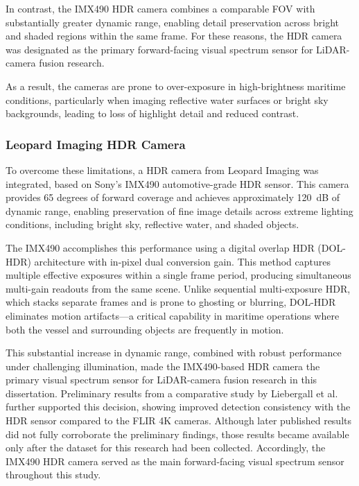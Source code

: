 \documentclass{erauthesis}
\begin{document}
In contrast, the IMX490 \ac{HDR} camera combines a comparable \ac{FOV} with substantially greater dynamic range, enabling detail preservation across bright and shaded regions within the same frame.  
For these reasons, the \ac{HDR} camera was designated as the primary forward-facing visual spectrum sensor for \ac{LiDAR}-camera fusion research.  
 
As a result, the cameras are prone to over-exposure in high-brightness maritime conditions, particularly when imaging reflective water surfaces or bright sky backgrounds, leading to loss of highlight detail and reduced contrast.  

\subsubsection{Leopard Imaging HDR Camera}

To overcome these limitations, a \ac{HDR} camera from Leopard Imaging was integrated, based on Sony’s IMX490 automotive-grade \ac{HDR} sensor.  
This camera provides 65 degrees of forward coverage and achieves approximately 120~dB of dynamic range, enabling preservation of fine image details across extreme lighting conditions, including bright sky, reflective water, and shaded objects.  

The IMX490 accomplishes this performance using a digital overlap \ac{HDR} (DOL-HDR) architecture with in-pixel dual conversion gain.  
This method captures multiple effective exposures within a single frame period, producing simultaneous multi-gain readouts from the same scene.  
Unlike sequential multi-exposure \ac{HDR}, which stacks separate frames and is prone to ghosting or blurring, DOL-\ac{HDR} eliminates motion artifacts—a critical capability in maritime operations where both the vessel and surrounding objects are frequently in motion.  

This substantial increase in dynamic range, combined with robust performance under challenging illumination, made the IMX490-based \ac{HDR} camera the primary visual spectrum sensor for \ac{LiDAR}-camera fusion research in this dissertation.  
Preliminary results from a comparative study by Liebergall et al.~\cite{liebergall} further supported this decision, showing improved detection consistency with the \ac{HDR} sensor compared to the FLIR 4K cameras.  
Although later published results did not fully corroborate the preliminary findings, those results became available only after the dataset for this research had been collected.  
Accordingly, the IMX490 \ac{HDR} camera served as the main forward-facing visual spectrum sensor throughout this study.  
\end{document}

